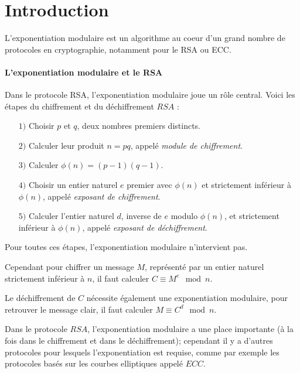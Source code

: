 \documentclass[12pt, a4paper]{memoir}
\begin{document}
\cleardoublepage
\tableofcontents* %
\normalsize

\mainmatter

\chapter{Introduction} 
L'exponentiation modulaire est un algorithme au coeur d'un grand nombre de protocoles en cryptographie, notamment pour le RSA ou ECC.

\subsubsection{L'exponentiation modulaire et le RSA}

Dans le protocole RSA, l'exponentiation modulaire joue un rôle central. Voici les étapes du 
chiffrement et du déchiffrement $RSA$ :
\begin{itemize}
 \item [$1)$] Choisir $p$ et $q$, deux nombres premiers distincts.
 \item [$2)$] Calculer leur produit $n = pq$, appelé \emph{module de chiffrement}.
 \item [$3)$] Calculer $\phi(n) = (p-1)(q-1)$.
 \item [$4)$] Choisir un entier naturel $e$ premier avec $\phi(n)$ et strictement inférieur à $\phi(n)$,
 appelé \emph{exposant de chiffrement}.
 \item [$5)$] Calculer l'entier naturel $d$, inverse de $e$ modulo $\phi(n)$, et strictement inférieur à $\phi(n)$,
 appelé \emph{exposant de déchiffrement}.
\end{itemize}

Pour toutes ces étapes, l'exponentiation modulaire n'intervient pas.

Cependant pour chiffrer un message $M$, représenté par un entier naturel strictement inférieur à $n$, il faut 
calculer $C \equiv M^e \mod n$.

Le déchiffrement de $C$ nécessite également une exponentiation modulaire, pour retrouver le message clair,
il faut calculer $M \equiv C^d \mod n$.

Dans le protocole $RSA$, l'exponentiation modulaire a une place importante (à la fois dans le chiffrement et dans le déchiffrement);
cependant il y a d'autres protocoles pour lesquels l'exponentiation est requise, comme par exemple les protocoles
basés sur les courbes elliptiques appelé $ECC$.
\end{document}

